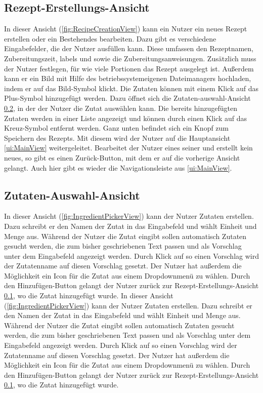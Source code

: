 \documentclass[parskip=full]{scrartcl}
\begin{document}
\subsection{Rezept-Erstellungs-Ansicht}
\label{ui:RecipeCreationView}
In dieser Ansicht (\autoref{fig:RecipeCreationView}) kann ein Nutzer ein neues Rezept erstellen oder ein Bestehendes bearbeiten. Dazu gibt es verschiedene Eingabefelder, die der Nutzer ausfüllen kann. Diese umfassen den Rezeptnamen, Zubereitungszeit, \gls{labels} und  sowie die Zubereitungsanweisungen. Zusätzlich muss der Nutzer festlegen, für wie viele Portionen das Rezept ausgelegt ist. Außerdem kann er ein Bild mit Hilfe des betriebssystemeigenen Dateimanagers hochladen, indem er auf das Bild-Symbol klickt.
Die Zutaten können mit einem Klick auf das Plus-Symbol hinzugefügt werden. Dazu öffnet sich die Zutaten-auswahl-Ansicht \ref{ui:IngredientPickerView}, in der der Nutzer die Zutat auswählen kann. Die bereits hinzugefügten Zutaten werden in einer Liste angezeigt und können durch einen Klick auf das Kreuz-Symbol entfernt werden. Ganz unten befindet sich ein Knopf zum Speichern des Rezepts. Mit diesem wird der Nutzer auf die Hauptansicht \ref{ui:MainView} weitergeleitet. Bearbeitet der Nutzer eines seiner  und erstellt kein neues, so gibt es einen Zurück-Button, mit dem er auf die vorherige Ansicht gelangt. Auch hier gibt es wieder die Navigationsleiste aus \ref{ui:MainView}.

\subsection{Zutaten-Auswahl-Ansicht}
\label{ui:IngredientPickerView}
In dieser Ansicht (\autoref{fig:IngredientPickerView}) kann der Nutzer Zutaten erstellen. Dazu schreibt er den Namen der Zutat in das Eingabefeld und wählt Einheit und Menge aus. Während der Nutzer die Zutat eingibt sollen automatisch Zutaten gesucht werden, die zum bisher geschriebenen Text passen und als Vorschlag unter dem Eingabefeld angezeigt werden. Durch Klick auf so einen Vorschlag wird der Zutatenname auf diesen Vorschlag gesetzt. Der Nutzer hat außerdem die Möglichkeit ein Icon für die Zutat aus einem Dropdownmenü zu wählen. Durch den Hinzufügen-Button gelangt der Nutzer zurück zur Rezept-Erstellungs-Ansicht \ref{ui:RecipeCreationView}, wo die Zutat hinzugefügt wurde.
In dieser Ansicht (\autoref{fig:IngredientPickerView}) kann der Nutzer Zutaten erstellen. Dazu schreibt er den Namen der Zutat in das Eingabefeld und wählt Einheit und Menge aus. Während der Nutzer die Zutat eingibt sollen automatisch Zutaten gesucht werden, die zum bisher geschriebenen Text passen und als Vorschlag unter dem Eingabefeld angezeigt werden. Durch Klick auf so einen Vorschlag wird der Zutatenname auf diesen Vorschlag gesetzt. Der Nutzer hat außerdem die Möglichkeit ein Icon für die Zutat aus einem Dropdownmenü zu wählen. Durch den Hinzufügen-Button gelangt der Nutzer zurück zur Rezept-Erstellungs-Ansicht \ref{ui:RecipeCreationView}, wo die Zutat hinzugefügt wurde.
\end{document}
